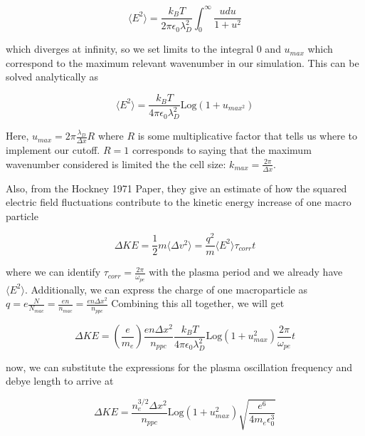 \begin{equation}
	\langle E^2 \rangle = \frac{k_B T}{2 \pi \epsilon_0 \lambda_D^2} \int_0^\infty \frac{u du}{1 + u^2}
\end{equation}

which diverges at infinity, so we set limits to the integral 0 and $u_{max}$ which correspond to the maximum relevant wavenumber in our simulation. This can be solved analytically as 

\begin{equation}
	\langle E^2 \rangle = \frac{k_B T}{4 \pi \epsilon_0 \lambda_D^2} \text{Log}(1 + u_{max^2}) \label{eq:e2}
\end{equation}

Here, $u_{max} = 2 \pi \frac{\lambda_D}{\Delta x} R$ where $R$ is some multiplicative factor that tells us where to implement our cutoff. $R = 1$ corresponds to saying that the maximum wavenumber considered is limited the the cell size: $k_{max} = \frac{2 \pi}{\Delta x}$. 

Also, from the Hockney 1971 Paper, they give an estimate of how the squared electric field fluctuations contribute to the kinetic energy increase of one macro particle

\begin{equation}
	\Delta KE = \frac{1}{2} m \langle \Delta v^2 \rangle  = \frac{q^2}{m} \langle E^2 \rangle \tau_{corr} t
\end{equation}

where we can identify $\tau_{corr} = \frac{2 \pi}{\omega_{pe}}$ with the plasma period and we already have $\langle E^2 \rangle$. Additionally, we can express the charge of one macroparticle as $q = e \frac{N}{N_{mac}} = \frac{e n}{n_{mac}} = \frac{e n \Delta x^2}{n_{ppc}}$ Combining this all together, we will get 

\begin{equation}
	\Delta KE = (\frac{e}{m_e}) \frac{e n \Delta x^2}{n_{ppc}} \frac{k_B T}{4 \pi \epsilon_0 \lambda_D^2} \text{Log}(1 + u_{max}^2) \frac{2 \pi}{\omega_{pe}} t 
\end{equation}

now, we can substitute the expressions for the plasma oscillation frequency and debye length to arrive at 

\begin{equation}
	\Delta KE = \frac{n_e^{3/2} \Delta x^2}{n_{ppc}} \text{Log}(1 + u_{max}^2) \sqrt{\frac{e^6}{4 m_e \epsilon_0^3}}
\end{equation}

